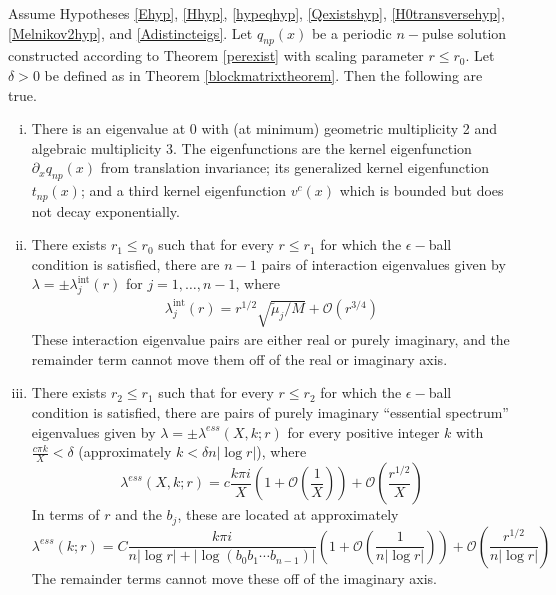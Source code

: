 \documentclass[thesis.tex]{subfiles}
\begin{document}

\begin{theorem}\label{locateeigtheorem}
Assume Hypotheses \ref{Ehyp}, \ref{Hhyp}, \ref{hypeqhyp}, \ref{Qexistshyp}, \ref{H0transversehyp}, \ref{Melnikov2hyp}, and \ref{Adistincteigs}. Let $q_{np}(x)$ be a periodic $n-$pulse solution constructed according to Theorem \ref{perexist} with scaling parameter $r \leq r_0$. Let $\delta > 0$ be defined as in Theorem \ref{blockmatrixtheorem}. Then the following are true.

\begin{enumerate}[(i)]

\item There is an eigenvalue at 0 with (at minimum) geometric multiplicity 2 and algebraic multiplicity 3. The eigenfunctions are the kernel eigenfunction $\partial_x q_{np}(x)$ from translation invariance; its generalized kernel eigenfunction $t_{np}(x)$; and a third kernel eigenfunction $v^c(x)$ which is bounded but does not decay exponentially.

\item There exists $r_1 \leq r_0$ such that for every $r \leq r_1$ for which the $\epsilon-$ball condition is satisfied, there are $n - 1$ pairs of interaction eigenvalues given by $\lambda = \pm \lambda^{\text{int}}_j(r)$ for $j = 1, \dots, n-1$, where
\begin{align*}
\lambda^{\text{int}}_j(r) = r^{1/2} \sqrt{\tilde{\mu}_j / M} + \mathcal{O}(r^{3/4})
\end{align*}
These interaction eigenvalue pairs are either real or purely imaginary, and the remainder term cannot move them off of the real or imaginary axis.

\item There exists $r_2 \leq r_1$ such that for every $r \leq r_2$ for which the $\epsilon-$ball condition is satisfied, there are pairs of purely imaginary ``essential spectrum'' eigenvalues given by $\lambda = \pm \lambda^{ess}(X,k; r)$ for every positive integer $k$ with $\frac{c \pi k}{X} < \delta$ (approximately $k < \delta n |\log r|$), where
\begin{equation}\label{lambdaess}
\lambda^{ess}(X, k; r) = c \frac{k \pi i }{X} \left( 1 + \mathcal{O}\left( \frac{1}{X} \right)\right) + \mathcal{O}\left( \frac{r^{1/2}}{X} \right)
\end{equation}
In terms of $r$ and the $b_j$, these are located at approximately
\begin{equation}\label{lambdaessr}
\lambda^{ess}(k; r) = C \frac{k \pi i }{n |\log r| + |\log (b_0 b_1 \cdots b_{n-1})|}  \left( 1 + \mathcal{O}\left( \frac{1}{n |\log r|} \right)\right) + \mathcal{O}\left( \frac{r^{1/2}}{n |\log r|} \right)
\end{equation}
The remainder terms cannot move these off of the imaginary axis.


\end{enumerate}
\end{theorem}
\end{document}
